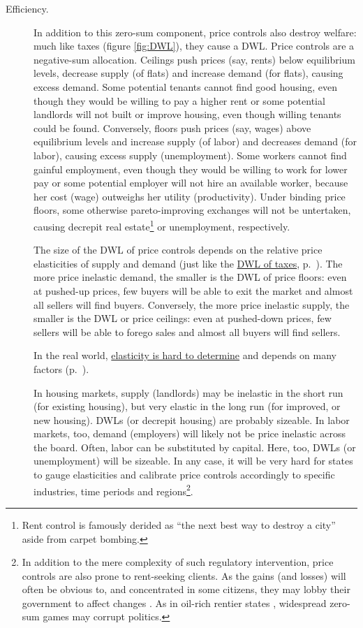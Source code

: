 \begin{description}
	\item[Efficiency.] 
		In addition to this zero-sum component, price controls also destroy welfare: much like taxes (figure \ref{fig:DWL}), they cause a \gls{DWL}.  Price controls are a negative-sum allocation. Ceilings push prices (say, rents) below equilibrium levels, decrease supply (of flats) and increase demand (for flats), causing excess demand. Some potential tenants cannot find good housing, even though they would be willing to pay a higher rent or some potential landlords will not built or improve housing, even though willing tenants could be found. Conversely, floors push prices (say, wages) above equilibrium levels and increase supply (of labor) and decreases demand (for labor), causing excess supply (unemployment). Some workers cannot find gainful employment, even though they would be willing to work for lower pay or some potential employer will not hire an available worker, because her cost (wage) outweighs her utility (productivity). Under binding price floors, some otherwise pareto-improving exchanges will not be untertaken, causing decrepit real estate\footnote{
			Rent control is famously derided as ``the next best way to destroy a city'' aside from carpet bombing.} 
		or unemployment, respectively. 
	
		The size of the \gls{DWL} of price controls depends on the relative price elasticities of supply and demand (just like the \hyperref[sec:minimalDWL]{\gls{DWL} of taxes}, p.~\pageref{sec:minimalDWL}).
		The more price inelastic demand, the smaller is the \gls{DWL} of price floors: even at pushed-up prices, few buyers will be able to exit the market and almost all sellers will find buyers. Conversely, the more price inelastic supply, the smaller is the \gls{DWL} or price ceilings: even at pushed-down prices, few sellers will be able to forego sales and almost all buyers will find sellers. 
	
		In the real world, \hyperref[sec:well-determinedincidence]{elasticity is hard to determine} and depends on many factors (p.~\pageref{sec:well-determinedincidence}). 
	
		In housing markets, supply (landlords) may be inelastic in the short run (for existing housing), but very elastic in the long run (for improved, or new housing). \glspl{DWL} (or decrepit housing) are probably sizeable. In labor markets, too, demand (employers) will likely not be price inelastic across the board. Often, labor can be substituted by capital. Here, too, \glspl{DWL} (or unemployment) will be sizeable. In any case, it will be very hard for states to gauge elasticities and calibrate price controls accordingly to specific industries, time periods and regions\footnote{
			In addition to the mere complexity of such regulatory intervention, price controls are also prone to rent-seeking clients. As the gains (and losses) will often be obvious to, and concentrated in some citizens, they may lobby their government to affect changes \citep{Peltzman1976,Posner1975,Krueger1974}. As in oil-rich rentier states \citep{Beblawi1990}, widespread zero-sum games may corrupt politics.}.
		

\end{description}
